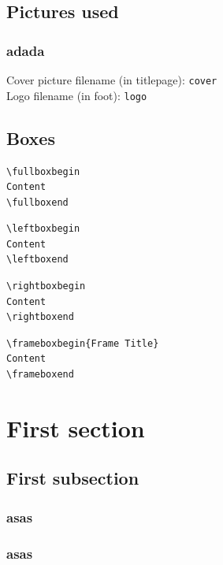 
\subsection{Pictures used}
\subsubsection{adada}


\noindent
Cover picture filename (in titlepage): \texttt{cover}\\
Logo filename (in foot): \texttt{logo}

\subsection{Boxes}

\begin{verbatim}
\fullboxbegin
Content
\fullboxend
\end{verbatim}

\begin{verbatim}
\leftboxbegin
Content
\leftboxend
\end{verbatim}

\begin{verbatim}
\rightboxbegin
Content
\rightboxend
\end{verbatim}

\begin{verbatim}
\frameboxbegin{Frame Title}
Content
\frameboxend
\end{verbatim}

\newpage

\section{First section}
\lipsum[1]

\fullboxbegin
\lipsum[1]
\fullboxend

\lipsum[1]

\subsection{First subsection}
\lipsum[1]
\subsubsection{asas}
\subsubsection*{asas}


